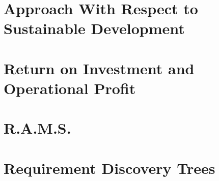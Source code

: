 \documentclass[11pt]{report}
\begin{document}
%
%

\chapter{Approach With Respect to Sustainable Development}
\label{blSustainable}





%
%

\chapter{Return on Investment and Operational Profit}
\label{blInvestment}


%
%

\chapter{R.A.M.S.}
\label{blRAMS1}


%
%




%
%

\appendix
\chapter{Requirement Discovery Trees}
\label{reqdisctree}
\end{document}
